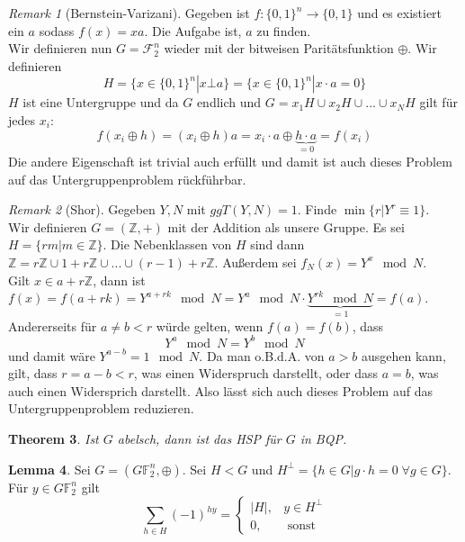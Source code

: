 \documentclass[a4paper, 12pt]{article}
\theoremstyle{plain}
\newtheorem{theorem}{Theorem}[section] %
\theoremstyle{definition}
\theoremstyle{lemma}
\newtheorem{lemma}[theorem]{Lemma}
\theoremstyle{remark}
\newtheorem{remark}[theorem]{Remark}
\theoremstyle{example}
\begin{document}
	\begin{remark}[Bernstein-Varizani]
		Gegeben ist $f:\{0,1\}^n \to \{0,1\}$ und es existiert ein $a$ sodass $f(x) = xa$. Die Aufgabe ist, $a$ zu finden.\\
		Wir definieren nun $G = \mathcal{F}_2^n$ wieder mit der bitweisen Paritätsfunktion $\oplus$. Wir definieren \[H = \{x \in \{0,1\}^n | x\bot a\} = \{x \in \{0,1\}^n | x\cdot a = 0\}\]
		$H$ ist eine Untergruppe und da $G$ endlich und $G = x_1H \cup x_2H \cup ... \cup x_NH$ gilt für jedes $x_i$: \[f(x_i\oplus h) = (x_i\oplus h)a = x_i \cdot a \oplus \underbrace{h \cdot a}_{=0} = f(x_i)\] Die andere Eigenschaft ist trivial auch erfüllt und damit ist auch dieses Problem auf das Untergruppenproblem rückführbar.
	\end{remark}
	\begin{remark}[Shor]
		Gegeben $Y,N$ mit $ggT(Y,N) = 1$. Finde $\min\{r|Y^r \equiv 1\}$.\\
		Wir definieren $G = (\mathbb{Z},+)$ mit der Addition als unsere Gruppe. Es sei $H = \{rm | m \in \mathbb{Z}\}$. Die Nebenklassen von $H$ sind dann $\mathbb{Z} = r\mathbb{Z} \cup 1+r\mathbb{Z} \cup ... \cup (r-1) + r\mathbb{Z}$. Außerdem sei $f_N(x) = Y^x\mod N$.\\
		Gilt $x \in a+r\mathbb{Z}$, dann ist $f(x) = f(a+rk) = Y^{a+rk}\mod N = Y^a \mod N \cdot\underbrace{ Y^{rk} \mod N}_{=1} = f(a)$. Andererseits für $a\neq b < r$ würde gelten, wenn $f(a) = f(b)$, dass \[Y^a \mod N = Y^b \mod N\] und damit wäre $Y^{a-b} = 1 \mod N$. Da man o.B.d.A. von $a > b$ ausgehen kann, gilt, dass $r = a-b < r$, was einen Widerspruch darstellt, oder dass $a=b$, was auch einen Widersprich darstellt. Also lässt sich auch dieses Problem auf das Untergruppenproblem reduzieren. 
	\end{remark}
	\begin{theorem}
		Ist $G$ abelsch, dann ist das HSP für $G$  in BQP.
	\end{theorem}
	\begin{lemma}
		Sei $G = (G\mathbb{F}_2^n, \oplus)$. Sei $H<G$ und $H^\bot = \{h \in G | g\cdot h = 0 \; \forall g \in G\}$.  Für $y \in G\mathbb{F}_2^n$ gilt \[\sum_{h \in H} (-1)^{hy} = \begin{cases}
			\left|H\right|, & y \in H^\bot\\
			0, & \text{ sonst}
		\end{cases}\]
	\end{lemma}
\end{document}
